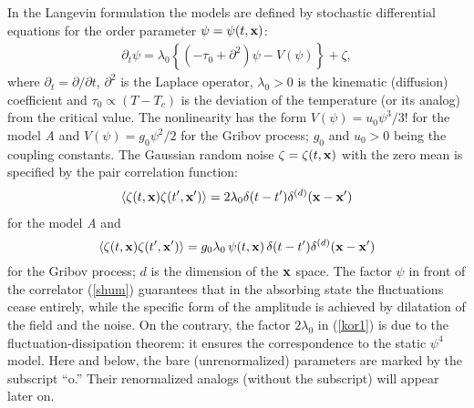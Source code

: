 \documentclass[12pt]{iopart}
\begin{document}
In the Langevin formulation the models are defined by stochastic
differential equations for the order parameter
$\psi = \psi(t,{\bf x})$:
\begin{eqnarray}
\partial_{t} \psi = \lambda_{0} \left\{ (-\tau_{0} +
\partial^{2}) \psi - V(\psi) \right\} + \zeta ,
\label{stoh}
\end{eqnarray}
where $\partial_{t}= \partial/ \partial t$, $\partial^{2}$ is the
Laplace operator, $\lambda_{0}>0$ is the kinematic (diffusion)
coefficient and $\tau_{0} \propto (T-T_{c})$ is the deviation of
the temperature (or its analog) from the critical value. The
nonlinearity has the form $V(\psi)=u_{0} \psi^{3}/3!$ for the model {\it A}
and $V(\psi)=g_{0} \psi^{2}/2$ for the Gribov process; $g_{0}$ and
$u_{0}>0$ being the coupling constants. The Gaussian random noise
$\zeta=\zeta(t,{\bf x})$ with the zero mean is specified by the
pair correlation function:
\begin{eqnarray}
\langle \zeta (t,{\bf x})\zeta (t',{\bf x'}) \rangle =
2 \lambda_{0}  \delta(t-t')\delta^{(d)}({\bf x}-{\bf x}')
\label{kor1}
\end{eqnarray}
for the model {\it A} and
\begin{equation}
\langle \zeta (t,{\bf x})\zeta (t',{\bf x'}) \rangle = g_{0}\lambda_{0}\,
\psi(t,{\bf x})\,   \delta(t-t')\delta^{(d)}({\bf x}-{\bf x}')
\label{shum}
\end{equation}
for the Gribov process; $d$ is the dimension of the ${\bf x}$ space. The
factor $\psi$ in front of the correlator (\ref{shum}) guarantees that in the
absorbing state the fluctuations cease entirely, while the specific form of the amplitude
is achieved by dilatation of the field and the noise. On the contrary, the factor
$2\lambda_{0}$ in (\ref{kor1}) is due to the fluctuation-dissipation theorem: it 
ensures the correspondence to the static
$\psi^{4}$ model. Here and below, the bare (unrenormalized) parameters are
marked by the subscript ``o.'' Their renormalized analogs (without
the subscript) will appear later on.
\end{document}
